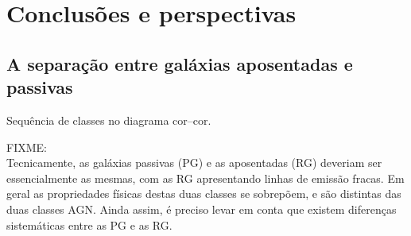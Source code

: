 


\chapter{Conclusões e perspectivas}
\label{sec:conclusao}



\section{A separação entre galáxias aposentadas e passivas}

Sequência de classes no diagrama cor--cor.

FIXME:\\
Tecnicamente, as galáxias passivas (PG) e as aposentadas (RG) deveriam ser
essencialmente as mesmas, com as RG apresentando linhas de emissão fracas. Em
geral as propriedades físicas destas duas classes se sobrepõem, e são distintas
das duas classes AGN. Ainda assim, é preciso levar em conta que existem
diferenças sistemáticas entre as PG e as RG.


